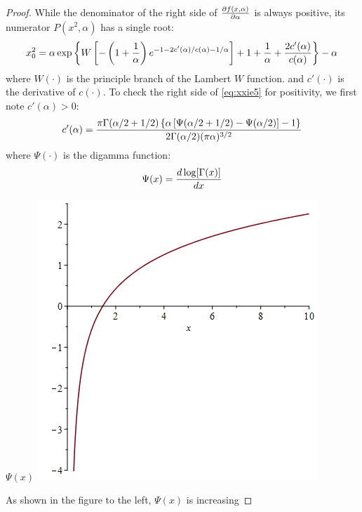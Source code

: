 \documentclass[11pt,a4]{amsart}
\newcommand{\pd}{\partial}
\newcommand{\1}{{\mathbf 1}}
\begin{document}
\begin{proof}
  While the denominator of the right side of ${\pd f(x, \alpha) \over \pd \alpha}$ is
  always positive, its numerator $P(x^2, \alpha)$ has a single root:
  \begin{equation}
    \label{eq:xxie5}
    x_0^2 = \alpha\exp\left\{
      W\left[
        -\left(1 + {1 \over \alpha}\right)
        e^{-1 - 2 c'(\alpha)/c(\alpha) - 1/\alpha}
      \right]
      + 1 + {1 \over \alpha} + {2 c'(\alpha) \over c(\alpha)}
    \right\} - \alpha
  \end{equation}
  where $W(\cdot)$ is the principle branch of the Lambert $W$
  function. and $c'(\cdot)$ is the derivative of $c(\cdot)$. To check
  the right side of \eqref{eq:xxie5} for positivity, we first note
  $c'(\alpha) > 0$:
  \[
  c'(\alpha) = {
    \pi \Gamma(\alpha/2 + 1/2) \left\{
      \alpha \left[ \Psi(\alpha/2 + 1/2) - \Psi(\alpha/2)\right] - 1
    \right\}
    \over
    2 \Gamma(\alpha/2) (\pi \alpha)^{3/2}
  }
  \]
  where $\Psi(\cdot)$ is the digamma function:
  \[
  \Psi(x) = {d \log[\Gamma(x)] \over d x}
  \]
  \begin{minipage}{0.48\textwidth}
    $\Psi(x)$ \linebreak
    \includegraphics[width=\textwidth]{digamma.png}
  \end{minipage}\hfill
  \begin{minipage}{0.5\textwidth}
    As shown in the figure to the left, $\Psi(x)$ is increasing

\end{minipage}
\end{proof}
\end{document}
